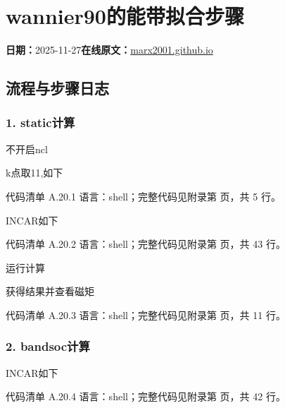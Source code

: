 \documentclass[lang=cn,scheme=chinese,color=blue,device=normal,toc=onecol,math=cm]{elegantbook}
\begin{document}
\section{wannier90的能带拟合步骤}
\begin{articlemeta}
\textbf{日期：}2025-11-27\hfill\textbf{在线原文：}\href{https://marx2001.github.io/sci-note\_posts/20251127-band}{marx2001.github.io}
\end{articlemeta}

\subsection{流程与步骤日志}


\subsubsection{1. static计算}


不开启ncl\par


k点取11,如下\par


\begin{codeindexbox}{代码清单 A.20.1}
语言：shell；完整代码见附录第 \pageref{code:20:1} 页，共 5 行。
\end{codeindexbox}


INCAR如下\par


\begin{codeindexbox}{代码清单 A.20.2}
语言：shell；完整代码见附录第 \pageref{code:20:2} 页，共 43 行。
\end{codeindexbox}


运行计算\par


获得结果并查看磁矩\par


\begin{codeindexbox}{代码清单 A.20.3}
语言：shell；完整代码见附录第 \pageref{code:20:3} 页，共 11 行。
\end{codeindexbox}


\subsubsection{2. bandsoc计算}


INCAR如下\par


\begin{codeindexbox}{代码清单 A.20.4}
语言：shell；完整代码见附录第 \pageref{code:20:4} 页，共 42 行。
\end{codeindexbox}
\end{document}
